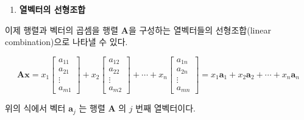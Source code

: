 \documentclass[
  11pt,
  a4paper,
  oneside]{scrbook}
\providecommand{\tightlist}{%
  \setlength{\itemsep}{0pt}\setlength{\parskip}{0pt}}\usepackage{longtable,booktabs,array}
\theoremstyle{definition}
\theoremstyle{definition}
\theoremstyle{plain}
\theoremstyle{remark}
\begin{document}
\begin{enumerate}
\def\labelenumi{\arabic{enumi}.}
\setcounter{enumi}{1}
\tightlist
\item
  \textbf{열벡터의 선형조합}
\end{enumerate}

이제 행렬과 벡터의 곱셈을 행렬 \(\pmb A\)을 구성하는 열벡터들의
선형조합(linear combination)으로 나타낼 수 있다.

\[
{\pmb A} {\pmb x} = 
x_1
\begin{bmatrix}
a_{11} \\
a_{21} \\
\vdots \\
a_{m1} 
\end{bmatrix} 
+ 
x_2 
\begin{bmatrix}
a_{12} \\
a_{22} \\
\vdots \\
a_{m2} 
\end{bmatrix} 
+ \cdots + 
x_n 
\begin{bmatrix}
a_{1n} \\
a_{2n} \\
\vdots \\
a_{mn} 
\end{bmatrix}
=
x_1 {\pmb a}_1 + x_2 {\pmb a}_2 + \cdots + x_n {\pmb a}_n 
\]

위의 식에서 벡터 \(\pmb a_j\) 는 행렬 \(\pmb A\) 의 \(j\) 번째
열벡터이다.
\end{document}
